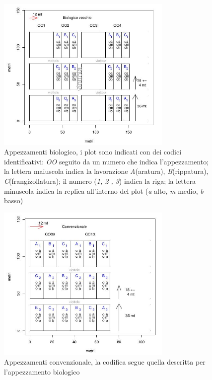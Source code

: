 \documentclass[11pt, a4paper, openright, titlepage, final, language = italian]{book}
\begin{document}
\begin{figure}
  \centering
  \includegraphics[width=0.75\textwidth]{../foto/OO_sito.jpeg}
  \caption{Appezzamenti biologico, i plot sono indicati con dei codici
    identificativi: \emph{OO} seguito da un numero che indica
    l'appezzamento; la lettera maiuscola indica la lavorazione
    \emph{A}(aratura), \emph{B}(rippatura), \emph{C}(frangizollatura);
    il numero (\emph{1, 2 , 3}) indica la riga; la lettera minuscola
    indica la replica all'interno del plot (\emph{a} alto, \emph{m}
    medio, \emph{b} basso) \label{fig:OO_sito}}
\end{figure}

\begin{figure}
  \centering
  \includegraphics[width=0.75\textwidth]{../foto/CO_sito.jpeg}
  \caption{Appezzamenti convenzionale, la codifica segue quella
    descritta per l'appezzamento biologico \label{fig:CO_sito}}

\end{figure}
\end{document}
